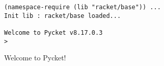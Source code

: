 \begin{figure}[!htbp]
  \centering
  \begin{minipage}{0.5\textwidth}
  \begin{lstlisting}[style=bashstyle]
(namespace-require (lib "racket/base")) ...
Init lib : racket/base loaded...

Welcome to Pycket v8.17.0.3
>
  \end{lstlisting}
  \end{minipage}
  \caption{Welcome to Pycket!}
  \label{fig:welcome-to-pycket}
\end{figure}
